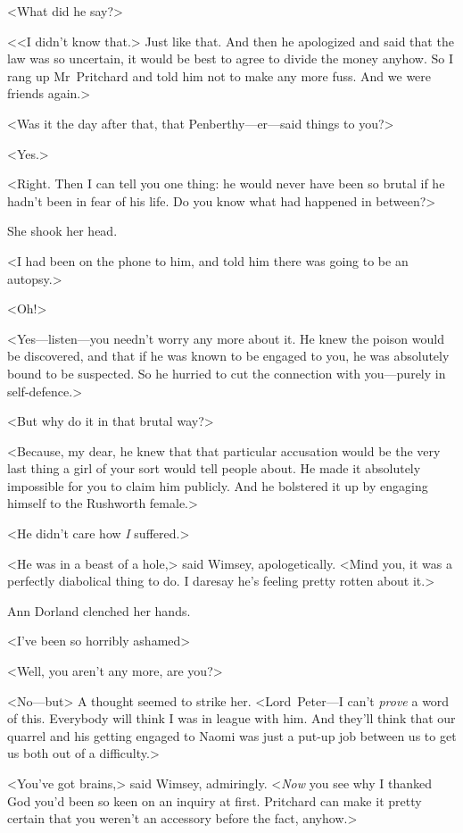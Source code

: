 <What did he say?>

<<I didn't know that.> Just like that. And then he apologized and said that the law was so uncertain, it would be best to agree to divide the money anyhow. So I rang up Mr~Pritchard and told him not to make any more fuss. And we were friends again.>

<Was it the day after that, that Penberthy—er—said things to you?>

<Yes.>

<Right. Then I can tell you one thing: he would never have been so brutal if he hadn't been in fear of his life. Do you know what had happened in between?>

She shook her head.

<I had been on the phone to him, and told him there was going to be an autopsy.>

<Oh!>

<Yes—listen—you needn't worry any more about it. He knew the poison would be discovered, and that if he was known to be engaged to you, he was absolutely bound to be suspected. So he hurried to cut the connection with you—purely in self-defence.>

<But why do it in that brutal way?>

<Because, my dear, he knew that that particular accusation would be the very last thing a girl of your sort would tell people about. He made it absolutely impossible for you to claim him publicly. And he bolstered it up by engaging himself to the Rushworth female.>

<He didn't care how \emph{I} suffered.>

<He was in a beast of a hole,> said Wimsey, apologetically. <Mind you, it was a perfectly diabolical thing to do. I daresay he's feeling pretty rotten about it.>

Ann Dorland clenched her hands.

<I've been so horribly ashamed\longdash>

<Well, you aren't any more, are you?>

<No—but\longdash> A thought seemed to strike her. <Lord~Peter—I can't \emph{prove} a word of this. Everybody will think I was in league with him. And they'll think that our quarrel and his getting engaged to Naomi was just a put-up job between us to get us both out of a difficulty.>

<You've got brains,> said Wimsey, admiringly. <\emph{Now} you see why I thanked God you'd been so keen on an inquiry at first. Pritchard can make it pretty certain that you weren't an accessory before the fact, anyhow.>


